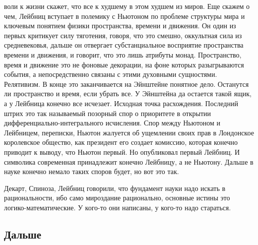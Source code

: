 \documentclass[a4paper, 12pt]{article}
\begin{document}
воли к жизни скажет, что все к худшему в этом худшем из миров. Еще 
скажем о чем, Лейбниц вступает в полемику с Ньютоном по проблеме 
структуры мира и ключевым понятием физики пространства, времени 
и движения. Он один из первых критикует силу тяготения, говоря, что это 
смешно, оккультная сила из средневековья, дальше он отвергает 
субстанциальное восприятие пространства времени и движения, и говорит, 
что это лишь атрибуты монад. Пространство, время и движение это не 
фоновые декорации, на фоне которых разыгрываются события, 
а непосредственно связаны с этими духовными сущностями. Релятивизм. 
В конце это заканчивается на Эйнштейне понятное дело. Останутся ли 
пространство и время, если убрать все. У Эйнштейна да остается такой 
ящик, а у Лейбница конечно все исчезает. Исходная точка расхождения. 
Последний штрих это так называемый позорный спор о приоритете в открытии 
дифференциально-интегрального исчисления. Спор между Ньютоном 
и Лейбницем, переписки, Ньютон жалуется об ущемлении своих прав 
в Лондонское королевское общество, как президент его создает комиссию, 
которая конечно приводит к выводу, что Ньютон первый. Но опубликовал 
первый Лейбниц. И символика современная принадлежит конечно Лейбницу, 
а не Ньютону. Дальше в науке конечно немало таких споров будет, но вот 
это так.

Декарт, Спиноза, Лейбниц говорили, что фундамент науки надо искать 
в рациональности, ибо само мироздание рационально, основные истины это 
логико-математические. У кого-то они написаны, у кого-то надо стараться.


\subsection{Дальше}
\end{document}

